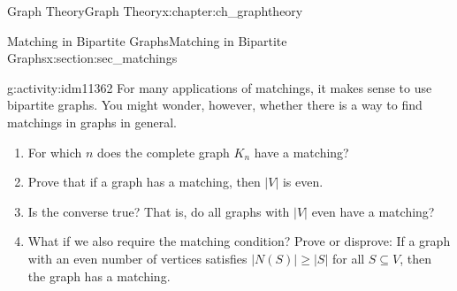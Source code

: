 \documentclass[oneside,10pt,]{book}
\numberwithin{equation}{chapter}
\newcommand{\card}[1]{\left| #1 \right|}
\begin{document}
\begin{chapterptx}{Graph Theory}{}{Graph Theory}{}{}{x:chapter:ch_graphtheory}
\begin{sectionptx}{Matching in Bipartite Graphs}{}{Matching in Bipartite Graphs}{}{}{x:section:sec_matchings}
\begin{activity}{}{g:activity:idm11362}%
For many applications of matchings, it makes sense to use bipartite graphs. You might wonder, however, whether there is a way to find matchings in graphs in general.%
\begin{enumerate}[font=\bfseries,label=(\alph*),ref=\alph*]
\item{}For which \(n\) does the complete graph \(K_n\) have a matching?%
\item{}Prove that if a graph has a matching, then \(\card{V}\) is even.%
\item{}Is the converse true?  That is, do all graphs with \(\card{V}\) even have a matching?%
\item{}What if we also require the matching condition?  Prove or disprove: If a graph with an even number of vertices satisfies \(\card{N(S)} \ge \card{S}\) for all \(S \subseteq V\), then the graph has a matching.%
\end{enumerate}
\end{activity}
\end{sectionptx}
\end{chapterptx}
%
%
%
%
\typeout{************************************************}
\typeout{************************************************}
%
%
\appendix
%
\end{document}
